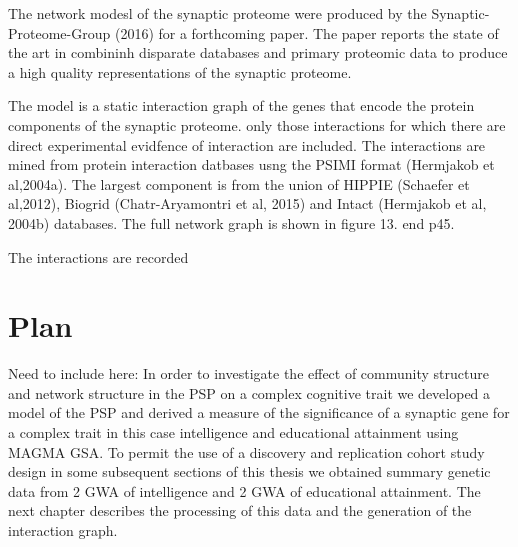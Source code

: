 The network modesl of the synaptic proteome were produced by the Synaptic-Proteome-Group (2016) for a forthcoming paper. The paper reports the state of the art in combininh disparate databases and primary proteomic data to produce a high quality representations of the synaptic proteome. 

The model is a static interaction graph of the genes that encode the protein components of the synaptic proteome. only those interactions for which there are direct experimental evidfence of interaction are included. The interactions are mined from protein interaction datbases usng the PSIMI format (Hermjakob et al,2004a). The largest component is from the union of HIPPIE (Schaefer et al,2012), Biogrid (Chatr-Aryamontri et al, 2015) and Intact (Hermjakob et al, 2004b) databases. The full network graph is shown in figure 13. end p45.

The interactions are recorded 

\section{Plan}
\label{sec:intro plan to procede to next chapter}

Need to include here: In order to investigate the effect of community structure and network structure in the PSP on a complex cognitive trait we developed a model of the PSP and derived a measure of the significance of a synaptic gene for a complex trait in this case intelligence and educational attainment using MAGMA GSA. To permit the use of a discovery and replication cohort study design in some subsequent sections of this thesis we obtained summary genetic data from 2 GWA of intelligence and 2 GWA of educational attainment. The next chapter describes the processing of this data and the generation of the interaction graph.
